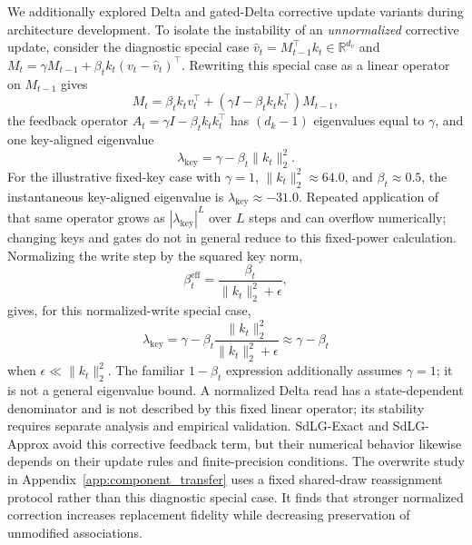 We additionally explored Delta and gated-Delta corrective update variants during architecture development. To isolate the instability of an \emph{unnormalized} corrective update, consider the diagnostic special case $\hat{v}_t=M_{t-1}^\top k_t\in\mathbb{R}^{d_v}$ and $M_t=\gamma M_{t-1}+\beta_t k_t(v_t-\hat{v}_t)^\top$. Rewriting this special case as a linear operator on $M_{t-1}$ gives
\begin{equation}
M_t = \beta_t k_t v_t^\top + \left(\gamma I - \beta_t k_t k_t^\top\right) M_{t-1},
\end{equation}
the feedback operator $A_t = \gamma I - \beta_t k_t k_t^\top$ has $(d_k-1)$
eigenvalues equal to $\gamma$, and one key-aligned eigenvalue
\begin{equation}
\lambda_{\text{key}} = \gamma - \beta_t \|k_t\|_2^2.
\end{equation}
For the illustrative fixed-key case with $\gamma=1$, $\|k_t\|_2^2\approx64.0$, and $\beta_t\approx0.5$, the instantaneous key-aligned eigenvalue is $\lambda_{\text{key}}\approx-31.0$. Repeated application of that same operator grows as $|\lambda_{\text{key}}|^L$ over $L$ steps and can overflow numerically; changing keys and gates do not in general reduce to this fixed-power calculation. Normalizing the write step by the squared key norm,
\begin{equation}
\beta_t^{\mathrm{eff}}=\frac{\beta_t}{\|k_t\|_2^2+\epsilon},
\end{equation}
gives, for this normalized-write special case,
\begin{equation}
\lambda_{\text{key}}
= \gamma - \beta_t\frac{\lVert k_t\rVert_2^2}{\lVert k_t\rVert_2^2+\epsilon}
\approx \gamma-\beta_t
\end{equation}
when $\epsilon\ll\lVert k_t\rVert_2^2$. The familiar $1-\beta_t$ expression additionally assumes $\gamma=1$; it is not a general eigenvalue bound. A normalized Delta read has a state-dependent denominator and is not described by this fixed linear operator; its stability requires separate analysis and empirical validation. SdLG-Exact and SdLG-Approx avoid this corrective feedback term, but their numerical behavior likewise depends on their update rules and finite-precision conditions. The overwrite study in Appendix~\ref{app:component_transfer} uses a fixed shared-draw reassignment protocol rather than this diagnostic special case. It finds that stronger normalized correction increases replacement fidelity while decreasing preservation of unmodified associations.

